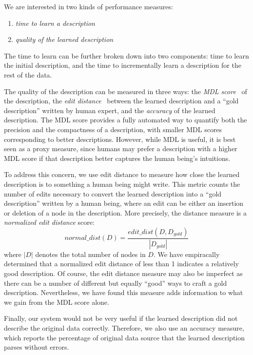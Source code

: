 We are interested in two kinds of performance measures: 
\begin{enumerate}
\item {\em time to learn a description} 
\item {\em quality of the learned description} 
\end{enumerate}

The time to learn can be further
broken down into two components: time to learn the initial description,
and the time to incrementally learn a description for the rest of the data.

The quality of the description can be measured in three ways:
the {\em MDL score}~\cite{mdlbook} of the description, the {\em edit distance}~\cite{Bille05:EditDistance} between the learned
description and a ``gold description'' written by human expert, and the {\em accuracy}
of the learned description.  The MDL score 
provides a fully automated way to quantify both the
precision and the compactness of a description, with smaller MDL scores corresponding to better descriptions.
However, while MDL is useful, it is best seen as a proxy measure, since humans may prefer a description with a higher MDL score if that description better captures the human being's intuitions. 


To address this concern, we use edit distance to measure how close the learned description is to something a human being might write.
This metric counts the number of edits necessary to convert the learned description into a ``gold description'' written by a human being, where an edit can be either an insertion or deletion of a node in the description. 
More precisely, the distance measure is a {\em normalized edit distance} score:
\[normal\_dist(D) = \frac{edit\_dist(D, D_{gold})}{|D_{gold}|}\]
where $|D|$ denotes the total number of nodes in $D$.
We have empiracally determined that a normalized edit distance of 
less than 1 indicates a relatively good description. 
Of course, the edit distance measure may also be imperfect as there can be a number of different but equally ``good'' ways 
to craft a gold description.  Nevertheless, we have found this measure
adds information to what we gain from the MDL score alone.

Finally, our system would not be very useful if the learned description 
did not describe the original data correctly. Therefore, we also use an accuracy measure, 
which reports the percentage of original data source that the 
learned description parses without errors.


